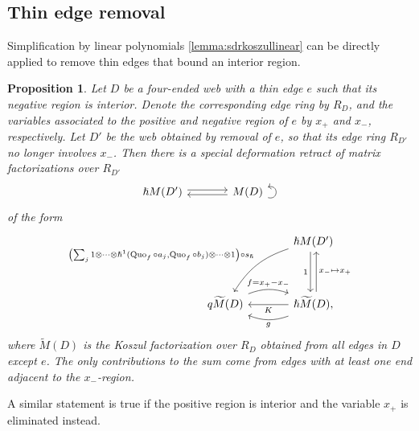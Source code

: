 \documentclass{article}
\DeclareMathOperator{\Quo}{Quo}
\newcommand{\sdr}[5]{%
  \begin{tikzcd}[column sep=large, ampersand replacement=\&]
    {#1} \arrow[r, "#3", shift left=0.5ex,] \arrow[r, leftarrow, "#4", shift right=0.5ex, swap] \& 
    {#2} \arrow[loop right, distance=1em, in=15, out=-15, "#5",swap]
  \end{tikzcd}%
}
\theoremstyle{plain} %
\newtheorem{proposition}[theorem]{Proposition}
\theoremstyle{definition} %
\theoremstyle{remark} %
\begin{document}
\subsection{Thin edge removal}
Simplification by linear polynomials \ref{lemma:sdrkoszullinear} can be directly applied to remove thin edges that bound an interior region.
\begin{proposition}
	Let $D$ be a four-ended web with a thin edge $e$ such that its negative region is interior. Denote the corresponding edge ring by $R_D$, and the variables associated to the positive and negative region of $e$ by $x_+$ and $x_-$, respectively. Let $D'$ be the web obtained by removal of $e$, so that its edge ring $R_{D'}$ no longer involves $x_-$. Then there is a special deformation retract of matrix factorizations over $R_{D'}$
	$$\sdr{\hslash M(D')}{M(D)}{}{}{}$$ 
	of the form
	$$
	\begin{tikzcd}[column sep=large]
		&
		\hslash M(D')
		\ar[dd, shift right=0.6ex, "1", swap]
		\ar[dd, leftarrow, shift left=0.6ex, "x_-\mapsto x_+"]
		\arrow[ddl, "{\left(\sum_{j}1\otimes\cdots \otimes\hslash^1(\Quo_f\circ a_j,\Quo_f\circ b_j)\otimes\cdots\otimes 1\right)\circ s_\hslash}", bend right=20, swap]
		\\
		\\
		q \widetilde M(D)
		\arrow[r, "f=x_+-x_-", shift left=0.5ex, bend left=20]
		& 
		\hslash \widetilde M(D)
		\ar[l, "K"]
		\arrow[l, "g", shift left=0.5ex, bend left=20]
		, 
	\end{tikzcd}
	$$
	where $\widetilde M(D)$ is the Koszul factorization over $R_D$ obtained from all edges in $D$ except $e$. The only contributions to the sum come from edges with at least one end adjacent to the $x_-$-region.
\end{proposition}

A similar statement is true if the positive region is interior and the variable $x_+$ is eliminated instead.
\end{document}
